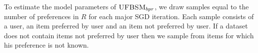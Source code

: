 To estimate the model parameters of $\textsc{UFBSM}_{bpr}$, we draw samples
equal to the number of preferences in $R$ for each major SGD iteration. Each sample
consists of a user, an item preferred by user and an item not preferred by user.
If a dataset does not contain items not preferred by user then we sample from
items for which his preference is not known.

